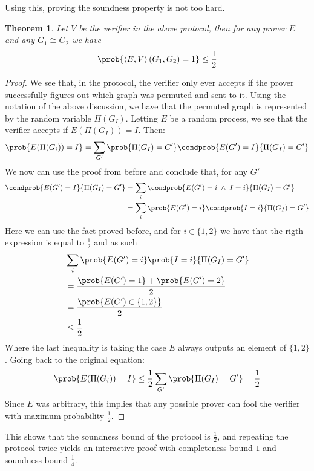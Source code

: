 \documentclass{article}
\newtheorem{theorem}{Theorem}
\begin{document}
Using this, proving the soundness property is not too hard. 
\begin{theorem}
    Let $V$ be the verifier in the above protocol, then for any  prover $E$ and any $G_1  \cong G_2$ we have \[ \prob{\left<E, V\right>(G_1, G_2) = 1} \leq \frac{1}{2} \] 
\end{theorem}
\begin{proof}
    We see that, in the protocol, the verifier only ever accepts if the prover successfully figures out which graph was permuted and sent to it. Using the notation of the above discussion, we have that the permuted graph is represented by the random variable $\Pi(G_I)$. Letting $E$ be a random process, we see that the verifier accepts if $E(\Pi(G_I)) = I$. Then:
    \[ \prob{E(\Pi(G_i)) = I} = \sum_{G'} \prob{\Pi(G_I) = G'} \condprob{E(G') = I}{\Pi(G_I) = G'} \]
    We now can use the proof from before and conclude that, for any $G'$
    \begin{align*}
    \condprob{E(G') = I}{\Pi(G_I) = G'} &= \sum_i \condprob{E(G') = i \; \land \; I = i}{\Pi(G_I) = G'} \\
    &= \sum_i \prob{E(G') = i } \condprob{ I = i}{\Pi(G_I) = G'} 
    \end{align*}
    Here we can use the fact proved before, and for $i \in \{1, 2\}$ we have that the rigth expression is equal to $\frac{1}{2}$ and as such
    \begin{align*}
         &\sum_i \prob{E(G') = i } \prob{ I = i}{\Pi(G_I) = G' } \\
         &= \frac{\prob{E(G') = 1 } + \prob{E(G') = 2}}{2} \\
         &= \frac{\prob{E(G') \in \{ 1, 2\}}}{2} \\
         &\leq \frac{1}{2}
    \end{align*}
    Where the last inequality is taking the case $E$ always outputs an element of $ \{ 1, 2\}$. Going back to the original equation:
    \[\prob{E(\Pi(G_i)) = I} \leq \frac{1}{2} \sum_{G'} \prob{\Pi(G_I) = G'} = \frac{1}{2} \]
    Since $E$ was arbitrary, this implies that any possible prover can fool the verifier with maximum probability $\frac{1}{2}$.
\end{proof}

This shows that the soundness bound of the protocol is $\frac{1}{2}$, and repeating the protocol twice yields an interactive proof with completeness bound $1$ and soundness bound $\frac{1}{4}$. 
\end{document}
